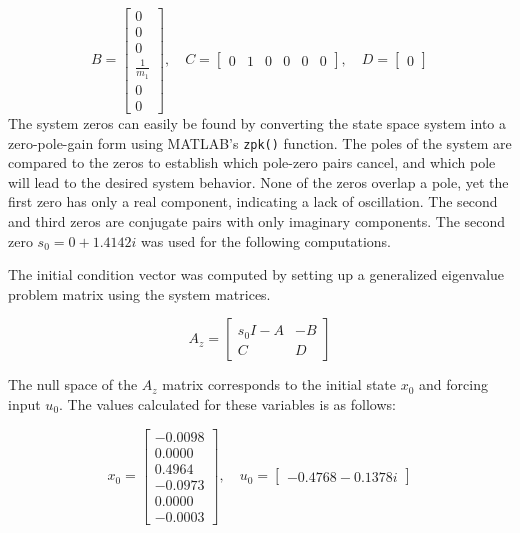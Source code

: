 \documentclass[../notes.tex]{subfiles}
\begin{document}
\begin{equation*}
    B =
    \begin{bmatrix}
        0 \\
        0 \\
        0 \\
        \frac{1}{m_1} \\
        0 \\
        0
    \end{bmatrix},
\quad
  C =
  \begin{bmatrix}
  0 &1 &0 &0 &0 &0
  \end{bmatrix},
  \quad
  D =
  \begin{bmatrix}
  0
  \end{bmatrix}
\end{equation*}
The system zeros can easily be found by converting the state space system into a zero-pole-gain form using MATLAB's \verb|zpk()| function. The poles of the system are compared to the zeros to establish which pole-zero pairs cancel, and which pole will lead to the desired system behavior. None of the zeros overlap a pole, yet the first zero has only a real component, indicating a lack of oscillation. The second and third zeros are conjugate pairs with only imaginary components. The second zero $ s_0 = 0 + 1.4142i $ was used for the following computations.

The initial condition vector was computed by setting up a generalized eigenvalue problem matrix using the system matrices.

\begin{equation*} \label{eq:eigenmatrix}
    A_z =
  \begin{bmatrix}
    s_0 I - A &-B  \\
    C &D 
  \end{bmatrix}
\end{equation*}

The null space of the $A_z$ matrix corresponds to the initial state $x_0$ and forcing input $u_0$. The values calculated for these variables is as follows:

\begin{equation*}
    x_0 = 
    \begin{bmatrix}
        -0.0098 \\
        0.0000 \\
        0.4964 \\
        -0.0973 \\ 
        0.0000 \\ 
        -0.0003
    \end{bmatrix},
    \quad
    u_0 = 
    \begin{bmatrix}
        -0.4768 - 0.1378i
    \end{bmatrix}
\end{equation*}
\end{document}
